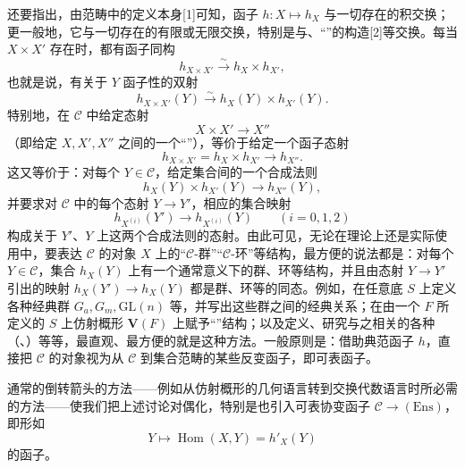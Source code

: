 还要指出，由范畴中的定义本身[1]可知，函子 $h:X\mapsto h_X$ 与一切存在的积交换；更一般地，它与一切存在的有限或无限交换，特别是与、“”的构造[2]等交换。每当 $X\times X'$ 存在时，都有函子同构
\[
 h_{X\times X'}\xrightarrow{\sim}h_X\times h_{X'},
\]
也就是说，有关于 $Y$ 函子性的双射
\[
 h_{X\times X'}(Y)\xrightarrow{\sim}h_X(Y)\times h_{X'}(Y).
\]
特别地，在 $\mathcal C$ 中给定态射
\[
 X\times X'\longrightarrow X''
\]
（即给定 $X,X',X''$ 之间的一个“”），等价于给定一个函子态射
\[
 h_{X\times X'}=h_X\times h_{X'}\longrightarrow h_{X''}.
\]
这又等价于：对每个 $Y\in\mathcal C$，给定集合间的一个合成法则
\[
 h_X(Y)\times h_{X'}(Y)\longrightarrow h_{X''}(Y),
\]
并要求对 $\mathcal C$ 中的每个态射 $Y\to Y'$，相应的集合映射
\[
 h_{X^{(i)}}(Y')\longrightarrow h_{X^{(i)}}(Y)\qquad(i=0,1,2)
\]
构成关于 $Y'$、$Y$ 上这两个合成法则的态射。由此可见，无论在理论上还是实际使用中，要表达 $\mathcal C$ 的对象 $X$ 上的“$\mathcal C$-群”“$\mathcal C$-环”等结构，最方便的说法都是：对每个 $Y\in\mathcal C$，集合 $h_X(Y)$ 上有一个通常意义下的群、环等结构，并且由态射 $Y\to Y'$ 引出的映射 $h_X(Y')\to h_X(Y)$ 都是群、环等的同态。例如，在任意底 $S$ 上定义各种经典群 $G_a,G_m,\mathrm{GL}(n)$ 等，并写出这些群之间的经典关系；在由一个 $F$ 所定义的 $S$ 上仿射概形 $\mathbf V(F)$ 上赋予“”结构；以及定义、研究与之相关的各种（、）等等，最直观、最方便的就是这种方法。一般原则是：借助典范函子 $h$，直接把 $\mathcal C$ 的对象视为从 $\mathcal C$ 到集合范畴的某些反变函子，即可表函子。

通常的倒转箭头的方法——例如从仿射概形的几何语言转到交换代数语言时所必需的方法——使我们把上述讨论对偶化，特别是也引入可表协变函子 $\mathcal C\to(\mathrm{Ens})$，即形如
\[
 Y\longmapsto\operatorname{Hom}(X,Y)=h'_X(Y)
\]
的函子。

